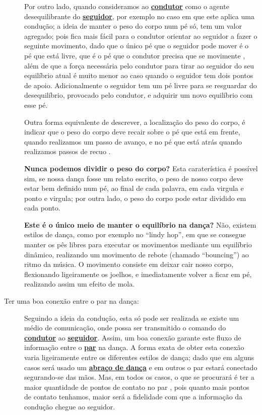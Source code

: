 \begin{description}
Por outro lado, quando consideramos ao 
\hyperref[def:Condutor]{\textbf{condutor}} como o agente desequilibrante do \hyperref[def:Seguidor]{\textbf{seguidor}}, 
por exemplo no caso em que este aplica uma condução;
a ideia de manter o peso do corpo num pé só, tem um valor agregado; 
pois fica mais fácil para o condutor orientar
ao seguidor a fazer o seguinte movimento, dado que o único pé que o seguidor pode mover é o pé
que está livre, que é o pé que o condutor precisa que se movimente \cite[pp. 77]{filho2016tango}, 
além de que a força necessária pelo condutor para tirar ao seguidor do seu equilíbrio 
atual é muito menor ao caso quando o seguidor tem dois pontos de apoio.
Adicionalmente o seguidor tem um pé livre para se resguardar do desequilíbrio, provocado pelo 
condutor, e adquirir um novo equilíbrio com esse pé.

Outra forma equivalente de descrever, a localização do peso do corpo, 
é indicar que o peso do corpo deve recair sobre o pé que está em frente, 
quando realizamos um passo de avanço, 
e no pé que está atrás quando realizamos passos de recuo \cite[pp. 19]{freitas1959danca}.


\textbf{Nunca podemos dividir o peso do corpo?} Esta caraterística é possível sim,
se nossa dança fosse um relato escrito, o peso de nosso corpo deve estar bem definido num pé,
ao final de cada palavra, em cada virgula e ponto e virgula; por outra lado, 
o peso do corpo pode estar dividido em cada ponto.

\textbf{Este é o único meio de manter o equilíbrio na dança?}  Não, 
existem estilos de dança, como por exemplo no ``lindy hop'', em que se consegue manter os pês libres 
para executar os movimentos mediante um equilíbrio dinâmico,
realizando um movimento de rebote (chamado ``bouncing'') ao ritmo da música.
O movimento consiste em deixar cair nosso corpo, flexionando ligeiramente  os joelhos, 
e imediatamente volver a ficar em pé, realizando assim um efeito de mola. 

\item[Ter uma boa conexão entre o par na dança:] Seguindo a ideia da condução, esta só pode
ser realizada se existe um médio de comunicação, onde possa ser transmitido
o comando do \hyperref[def:Condutor]{\textbf{condutor}} ao \hyperref[def:Seguidor]{\textbf{seguidor}}. 
Assim, um boa conexão garante este fluxo de informação entre o \hyperref[def:Par]{\textbf{par}} na dança. 
A forma exata de obter esta conexão varia ligeiramente entre os diferentes estilos de dança;
dado que em alguns casos será usado um \hyperref[def:abracodedanca]{\textbf{abraço de dança}} 
e em outros o par estará conectado segurando-se das mãos.
Mas, em todos os casos, 
o que se procurará é ter a maior quantidade de pontos de contato no par \cite[pp. 78]{filho2016tango},
pois quanto mais pontos de contato tenhamos, 
maior será a fidelidade com que a informação da condução chegue ao seguidor.



\end{description}
